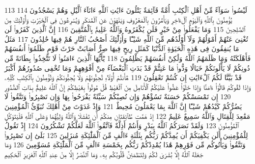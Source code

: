 {\tiny\colorbox{cl_aya}{113}} لَيْسُوا۟ سَوَآءً مِّنْ أَهْلِ ٱلْكِتَٰبِ أُمَّةٌ قَآئِمَةٌ يَتْلُونَ ءَايَٰتِ ٱللَّهِ ءَانَآءَ ٱلَّيْلِ وَهُمْ يَسْجُدُونَ
{\tiny\colorbox{cl_aya}{114}} يُؤْمِنُونَ بِٱللَّهِ وَٱلْيَوْمِ ٱلْءَاخِرِ وَيَأْمُرُونَ بِٱلْمَعْرُوفِ وَيَنْهَوْنَ عَنِ ٱلْمُنكَرِ وَيُسَٰرِعُونَ فِى ٱلْخَيْرَٰتِ وَأُو۟لَٰٓئِكَ مِنَ ٱلصَّٰلِحِينَ
{\tiny\colorbox{cl_aya}{115}} وَمَا يَفْعَلُوا۟ مِنْ خَيْرٍ فَلَن يُكْفَرُوهُ وَٱللَّهُ عَلِيمٌۢ بِٱلْمُتَّقِينَ
{\tiny\colorbox{cl_aya}{116}} إِنَّ ٱلَّذِينَ كَفَرُوا۟ لَن تُغْنِىَ عَنْهُمْ أَمْوَٰلُهُمْ وَلَآ أَوْلَٰدُهُم مِّنَ ٱللَّهِ شَيْـًٔا وَأُو۟لَٰٓئِكَ أَصْحَٰبُ ٱلنَّارِ هُمْ فِيهَا خَٰلِدُونَ
{\tiny\colorbox{cl_aya}{117}} مَثَلُ مَا يُنفِقُونَ فِى هَٰذِهِ ٱلْحَيَوٰةِ ٱلدُّنْيَا كَمَثَلِ رِيحٍ فِيهَا صِرٌّ أَصَابَتْ حَرْثَ قَوْمٍ ظَلَمُوٓا۟ أَنفُسَهُمْ فَأَهْلَكَتْهُ وَمَا ظَلَمَهُمُ ٱللَّهُ وَلَٰكِنْ أَنفُسَهُمْ يَظْلِمُونَ
{\tiny\colorbox{cl_aya}{118}} يَٰٓأَيُّهَا ٱلَّذِينَ ءَامَنُوا۟ لَا تَتَّخِذُوا۟ بِطَانَةً مِّن دُونِكُمْ لَا يَأْلُونَكُمْ خَبَالًا وَدُّوا۟ مَا عَنِتُّمْ قَدْ بَدَتِ ٱلْبَغْضَآءُ مِنْ أَفْوَٰهِهِمْ وَمَا تُخْفِى صُدُورُهُمْ أَكْبَرُ قَدْ بَيَّنَّا لَكُمُ ٱلْءَايَٰتِ إِن كُنتُمْ تَعْقِلُونَ
{\tiny\colorbox{cl_aya}{119}} هَٰٓأَنتُمْ أُو۟لَآءِ تُحِبُّونَهُمْ وَلَا يُحِبُّونَكُمْ وَتُؤْمِنُونَ بِٱلْكِتَٰبِ كُلِّهِۦ وَإِذَا لَقُوكُمْ قَالُوٓا۟ ءَامَنَّا وَإِذَا خَلَوْا۟ عَضُّوا۟ عَلَيْكُمُ ٱلْأَنَامِلَ مِنَ ٱلْغَيْظِ قُلْ مُوتُوا۟ بِغَيْظِكُمْ إِنَّ ٱللَّهَ عَلِيمٌۢ بِذَاتِ ٱلصُّدُورِ
{\tiny\colorbox{cl_aya}{120}} إِن تَمْسَسْكُمْ حَسَنَةٌ تَسُؤْهُمْ وَإِن تُصِبْكُمْ سَيِّئَةٌ يَفْرَحُوا۟ بِهَا وَإِن تَصْبِرُوا۟ وَتَتَّقُوا۟ لَا يَضُرُّكُمْ كَيْدُهُمْ شَيْـًٔا إِنَّ ٱللَّهَ بِمَا يَعْمَلُونَ مُحِيطٌ
{\tiny\colorbox{cl_aya}{121}} وَإِذْ غَدَوْتَ مِنْ أَهْلِكَ تُبَوِّئُ ٱلْمُؤْمِنِينَ مَقَٰعِدَ لِلْقِتَالِ وَٱللَّهُ سَمِيعٌ عَلِيمٌ
{\tiny\colorbox{cl_aya}{122}} إِذْ هَمَّت طَّآئِفَتَانِ مِنكُمْ أَن تَفْشَلَا وَٱللَّهُ وَلِيُّهُمَا وَعَلَى ٱللَّهِ فَلْيَتَوَكَّلِ ٱلْمُؤْمِنُونَ
{\tiny\colorbox{cl_aya}{123}} وَلَقَدْ نَصَرَكُمُ ٱللَّهُ بِبَدْرٍ وَأَنتُمْ أَذِلَّةٌ فَٱتَّقُوا۟ ٱللَّهَ لَعَلَّكُمْ تَشْكُرُونَ
{\tiny\colorbox{cl_aya}{124}} إِذْ تَقُولُ لِلْمُؤْمِنِينَ أَلَن يَكْفِيَكُمْ أَن يُمِدَّكُمْ رَبُّكُم بِثَلَٰثَةِ ءَالَٰفٍ مِّنَ ٱلْمَلَٰٓئِكَةِ مُنزَلِينَ
{\tiny\colorbox{cl_aya}{125}} بَلَىٰٓ إِن تَصْبِرُوا۟ وَتَتَّقُوا۟ وَيَأْتُوكُم مِّن فَوْرِهِمْ هَٰذَا يُمْدِدْكُمْ رَبُّكُم بِخَمْسَةِ ءَالَٰفٍ مِّنَ ٱلْمَلَٰٓئِكَةِ مُسَوِّمِينَ
{\tiny\colorbox{cl_aya}{126}} وَمَا جَعَلَهُ ٱللَّهُ إِلَّا بُشْرَىٰ لَكُمْ وَلِتَطْمَئِنَّ قُلُوبُكُم بِهِۦ وَمَا ٱلنَّصْرُ إِلَّا مِنْ عِندِ ٱللَّهِ ٱلْعَزِيزِ ٱلْحَكِيمِ
